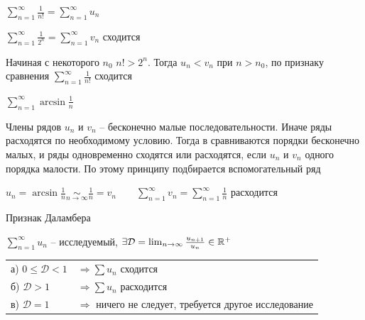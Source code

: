\documentclass[12pt]{article}
\begin{document}
     $\sum_{n = 1}^\infty \frac{1}{n!} = \sum_{n = 1}^\infty u_n$

    $\sum_{n = 1}^\infty \frac{1}{2^n} = \sum_{n = 1}^\infty v_n$ сходится

    Начиная с некоторого $n_0$ $n! > 2^n$. Тогда $u_n < v_n$ при $n > n_0$, по признаку сравнения $\sum_{n = 1}^\infty \frac{1}{n!}$ сходится


     $\sum_{n = 1}^\infty \arcsin \frac{1}{n}$

    \Nota Члены рядов $u_n$ и $v_n$ -- бесконечно малые последовательности. Иначе ряды расходятся по необходимому условию.
    Тогда в  сравниваются порядки бесконечно малых, и ряды одновременно сходятся или расходятся, если $u_n$ и $v_n$ одного
    порядка малости. По этому принципу подбирается вспомогательный ряд

    $u_n = \arcsin \frac{1}{n} \underset{n \to \infty}{\sim} \frac{1}{n} = v_n \quad\quad \sum_{n = 1}^\infty v_n = \sum_{n = 1}^\infty \frac{1}{n}$ расходится

    \hypertarget{dalambersign}{}

    \begin{MyTheorem}
         Признак Даламбера

        $\sum_{n = 1}^\infty u_n$ -- исследуемый, $\exists \mathcal{D} = \lim_{n \to \infty} \frac{u_{n + 1}}{u_n} \in \mathbb{R}^+$

        \begin{tabular}{ll}
            а) $0 \leq \mathcal{D} < 1$ & $\Longrightarrow \sum u_n$ сходится                                \\

            б) $\mathcal{D} > 1$        & $\Longrightarrow \sum u_n$ расходится                              \\

            в) $\mathcal{D} = 1$        & $\Longrightarrow$ ничего не следует, требуется другое исследование \\
        \end{tabular}
    \end{MyTheorem}
\end{document}
